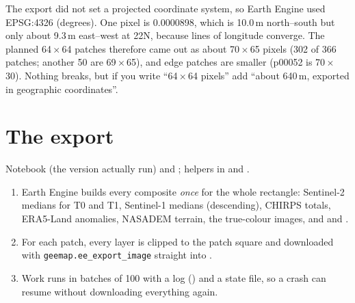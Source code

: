 \begin{watchout}
The export did not set a projected coordinate system, so Earth Engine used EPSG:4326 (degrees). One pixel is 0.0000898\dg, which is 10.0\,m north--south but only about 9.3\,m east--west at 22\dg N, because lines of longitude converge. The planned 64\,$\times$\,64 patches therefore came out as about 70\,$\times$\,65 pixels (302 of 366 patches; another 50 are 69\,$\times$\,65), and edge patches are smaller (p00052 is 70\,$\times$\,30). Nothing breaks, but if you write ``64\,$\times$\,64 pixels'' add ``about 640\,m, exported in geographic coordinates''.
\end{watchout}

\section{The export}

\begin{wherecode}
Notebook  (the version actually run) and ; helpers in  and .
\end{wherecode}

\begin{enumerate}
  \item Earth Engine builds every composite \emph{once} for the whole rectangle: Sentinel-2 medians for T0 and T1, Sentinel-1 medians (descending), CHIRPS totals, ERA5-Land anomalies, NASADEM terrain, the true-colour images, and \dndvi{} and \dnbr.
  \item For each patch, every layer is clipped to the patch square and downloaded with \texttt{geemap.ee\_export\_image} straight into .
  \item Work runs in batches of 100 with a log () and a state file, so a crash can resume without downloading everything again.
\end{enumerate}

